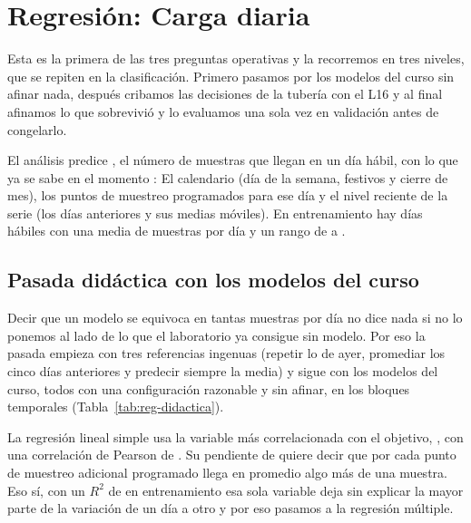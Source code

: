 \section{Regresión: Carga diaria}
\label{sec:regresion}

Esta es la primera de las tres preguntas operativas y la recorremos en tres
niveles, que se repiten en la clasificación. Primero pasamos por los modelos
del curso sin afinar nada, después cribamos las decisiones de la tubería con
el L16 y al final afinamos lo que sobrevivió y lo evaluamos una sola vez en
validación antes de congelarlo.

El análisis \codigo{\RegAnalisis} predice \codigo{\RegObjetivo}, el número de
muestras que llegan en un día hábil, con lo que ya se sabe en el momento
\codigo{\RegMomento}: El calendario (día de la semana, festivos y cierre de
mes), los puntos de muestreo programados para ese día y el nivel reciente de
la serie (los días anteriores y sus medias móviles). En entrenamiento hay
\RegDiasEntrenamiento{} días hábiles con una media de \RegMediaEntrenamiento{}
muestras por día y un rango de \RegMinimoEntrenamiento{} a
\RegMaximoEntrenamiento{}.

\subsection{Pasada didáctica con los modelos del curso}

Decir que un modelo se equivoca en tantas muestras por día no dice nada si no
lo ponemos al lado de lo que el laboratorio ya consigue sin modelo. Por eso la
pasada empieza con tres referencias ingenuas (repetir lo de ayer, promediar
los cinco días anteriores y predecir siempre la media) y sigue con los modelos
del curso, todos con una configuración razonable y sin afinar, en los
\RegBloques{} bloques temporales (Tabla~\ref{tab:reg-didactica}).

La regresión lineal simple usa la variable más correlacionada con el
objetivo, \codigo{\RegVariableSimple}, con una correlación de Pearson de
\RegCorrSimple{}. Su pendiente de \RegPendienteSimple{} quiere decir que por
cada punto de muestreo adicional programado llega en promedio algo más de una
muestra. Eso sí, con un $R^2$ de \RegRDosSimple{} en entrenamiento esa sola
variable deja sin explicar la mayor parte de la variación de un día a otro y
por eso pasamos a la regresión múltiple.

